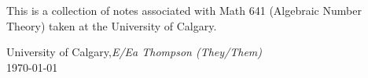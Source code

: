 %
%

\preface

This is a collection of notes associated with Math 641 (Algebraic Number Theory) taken at the University of Calgary.
 

\vspace{\baselineskip}
\begin{flushright}\noindent
University of Calgary,\hfill {\it E/Ea Thompson (They/Them)}\\
\today \hfill \\
\end{flushright}


